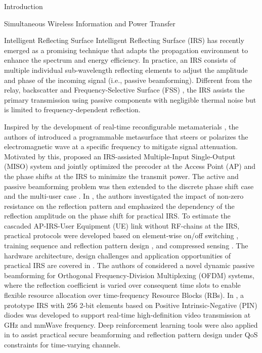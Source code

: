 \documentclass[journal]{IEEEtran}
\begin{document}
\begin{section}{Introduction}
\begin{subsection}{Simultaneous Wireless Information and Power Transfer}
		\end{subsection}


		\begin{subsection}{Intelligent Reflecting Surface}
			Intelligent Reflecting Surface (IRS) has recently emerged as a promising technique that adapts the propagation environment to enhance the spectrum and energy efficiency. In practice, an IRS consists of multiple individual sub-wavelength reflecting elements to adjust the amplitude and phase of the incoming signal (i.e., passive beamforming). Different from the relay, backscatter and Frequency-Selective Surface (FSS) \cite{Anwar2018}, the IRS assists the primary transmission using passive components with negligible thermal noise but is limited to frequency-dependent reflection.

			Inspired by the development of real-time reconfigurable metamaterials \cite{Cui2014}, the authors of \cite{Liaskos2018} introduced a programmable metasurface that steers or polarizes the electromagnetic wave at a specific frequency to mitigate signal attenuation. Motivated by this, \cite{Wu2018} proposed an IRS-assisted Multiple-Input Single-Output (MISO) system and jointly optimized the precoder at the Access Point (AP) and the phase shifts at the IRS to minimize the transmit power. The active and passive beamforming problem was then extended to the discrete phase shift case \cite{Wu2019a} and the multi-user case \cite{Wu2019}. In \cite{Abeywickrama2020}, the authors investigated the impact of non-zero resistance on the reflection pattern and emphasized the dependency of the reflection amplitude on the phase shift for practical IRS. To estimate the cascaded AP-IRS-User Equipment (UE) link without RF-chains at the IRS, practical protocols were developed based on element-wise on/off switching \cite{Nadeem2019}, training sequence and reflection pattern design \cite{You2019,Kang2020}, and compressed sensing \cite{Wang2020}. The hardware architecture, design challenges and application opportunities of practical IRS are covered in \cite{Wu2020}. The authors of \cite{Yang2020} considered a novel dynamic passive beamforming for Orthogonal Frequency-Division Multiplexing (OFDM) systems, where the reflection coefficient is varied over consequent time slots to enable flexible resource allocation over time-frequency Resource Blocks (RBs). In \cite{Dai2020}, a prototype IRS with \num{256} \num{2}-bit elements based on Positive Intrinsic-Negative (PIN) diodes was developed to support real-time high-definition video transmission at \si{GHz} and mmWave frequency. Deep reinforcement learning tools were also applied in \cite{Yang2021} to assist practical secure beamforming and reflection pattern design under QoS constraints for time-varying channels.
		\end{subsection}



\end{section}
\end{document}
